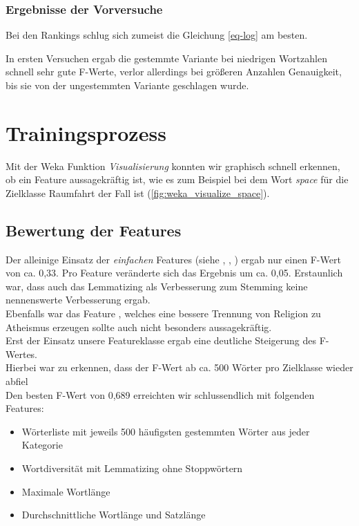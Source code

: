 \documentclass[
	11pt,
	a4paper
]{scrartcl}
\begin{document}
\subsubsection{Ergebnisse der Vorversuche}

Bei den Rankings schlug sich zumeist die Gleichung \ref{eq-log} am besten.

In ersten Versuchen ergab die gestemmte Variante bei niedrigen Wortzahlen schnell sehr gute F-Werte, verlor allerdings bei größeren Anzahlen Genauigkeit, bis sie von der ungestemmten Variante geschlagen wurde.

\section{Trainingsprozess}\label{trainingsprozess}
Mit der Weka Funktion \emph{Visualisierung} konnten wir graphisch schnell erkennen, ob ein Feature aussagekräftig ist, wie es zum
Beispiel bei dem Wort \emph{space} für die Zielklasse Raumfahrt der Fall ist (\autoref{fig:weka_visualize_space}).

\subsection{Bewertung der Features}
Der alleinige Einsatz der \emph{einfachen} Features (siehe \emph{}, \emph{},
\emph{}) ergab nur einen F-Wert von ca. 0,33. Pro Feature veränderte sich das Ergebnis um ca. 0,05. Erstaunlich
war, dass auch das Lemmatizing als Verbesserung zum Stemming keine nennenswerte Verbesserung ergab.\\
Ebenfalls war das Feature \emph{}, welches eine bessere Trennung von Religion zu Atheismus erzeugen sollte auch nicht
besonders aussagekräftig.\\
Erst der Einsatz unsere Featureklasse \emph{} ergab eine deutliche Steigerung des F-Wertes.\\
Hierbei war zu erkennen, dass der F-Wert ab ca. 500 Wörter pro Zielklasse wieder abfiel\\
Den besten F-Wert von 0,689 erreichten wir schlussendlich mit folgenden Features:
\begin{itemize}[itemsep=0pt,parsep=0pt, topsep=0pt]
	\item Wörterliste mit jeweils 500 häufigsten gestemmten Wörter aus jeder Kategorie
	\item Wortdiversität mit Lemmatizing ohne Stoppwörtern
	\item Maximale Wortlänge
	\item Durchschnittliche Wortlänge und Satzlänge
\end{itemize}
\end{document}
